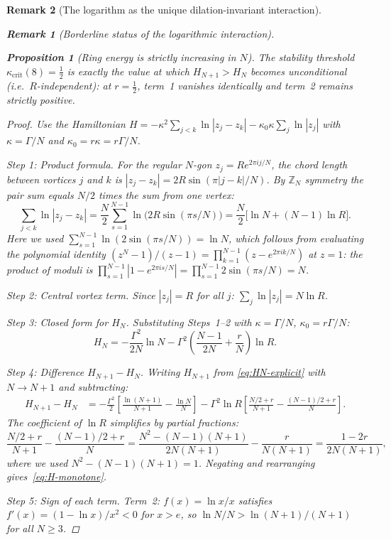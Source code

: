 \documentclass[12pt, a4paper]{article}
\newtheorem{proposition}[theorem]{Proposition}
\newtheorem{remark}{Remark}[section]
\numberwithin{equation}{section}
\begin{document}
\begin{remark}[The logarithm as the unique dilation-invariant interaction]
\begin{remark}[Borderline status of the logarithmic interaction]
\begin{proposition}[Ring energy is strictly increasing in $N$]
The stability threshold $\kappa_{\mathrm{crit}}(8) = \tfrac{1}{2}$ is
exactly the value at which $H_{N+1} > H_N$ becomes unconditional (i.e.\
$R$-independent): at $r = \tfrac{1}{2}$, term~1 vanishes identically
and term~2 remains strictly positive.
\end{proposition}
\begin{proof}
Use the Hamiltonian
$H = -\kappa^2\!\sum_{j<k}\ln|z_j - z_k| - \kappa_0\kappa\!\sum_j\ln|z_j|$
with $\kappa = \Gamma/N$ and $\kappa_0 = r\kappa = r\Gamma/N$.

\emph{Step 1: Product formula.}
For the regular $N$-gon $z_j = Re^{2\pi ij/N}$, the chord length
between vortices $j$ and $k$ is $|z_j - z_k| = 2R\sin(\pi|j-k|/N)$.
By $\mathbb{Z}_N$ symmetry the pair sum equals $N/2$ times the sum from
one vertex:
\[
  \sum_{j<k}\ln|z_j - z_k|
  = \frac{N}{2}\sum_{s=1}^{N-1}\ln\!\bigl(2R\sin(\pi s/N)\bigr)
  = \frac{N}{2}\bigl[\ln N + (N-1)\ln R\bigr].
\]
Here we used $\sum_{s=1}^{N-1}\ln(2\sin(\pi s/N)) = \ln N$, which
follows from evaluating the polynomial identity $(z^N-1)/(z-1) =
\prod_{k=1}^{N-1}(z - e^{2\pi ik/N})$ at $z = 1$: the product of
moduli is $\prod_{s=1}^{N-1}|1 - e^{2\pi is/N}|
= \prod_{s=1}^{N-1}2\sin(\pi s/N) = N$.

\emph{Step 2: Central vortex term.}
Since $|z_j| = R$ for all $j$: $\sum_j\ln|z_j| = N\ln R$.

\emph{Step 3: Closed form for $H_N$.}
Substituting Steps~1--2 with $\kappa = \Gamma/N$, $\kappa_0 = r\Gamma/N$:
\begin{equation}\label{eq:HN-explicit}
  H_N = -\frac{\Gamma^2}{2N}\ln N
        - \Gamma^2\!\left(\frac{N-1}{2N} + \frac{r}{N}\right)\ln R.
\end{equation}

\emph{Step 4: Difference $H_{N+1} - H_N$.}
Writing $H_{N+1}$ from \eqref{eq:HN-explicit} with $N\to N+1$ and
subtracting:
\begin{align*}
  H_{N+1} - H_N
  &= -\frac{\Gamma^2}{2}\!\left[\frac{\ln(N{+}1)}{N{+}1}
     - \frac{\ln N}{N}\right]
     - \Gamma^2\ln R\!\left[\frac{N/2+r}{N{+}1}
     - \frac{(N{-}1)/2+r}{N}\right].
\end{align*}
The coefficient of $\ln R$ simplifies by partial fractions:
\[
  \frac{N/2+r}{N{+}1} - \frac{(N{-}1)/2+r}{N}
  = \frac{N^2 - (N{-}1)(N{+}1)}{2N(N{+}1)} - \frac{r}{N(N{+}1)}
  = \frac{1-2r}{2N(N{+}1)},
\]
where we used $N^2-(N-1)(N+1) = 1$.  Negating and rearranging
gives~\eqref{eq:H-monotone}.

\emph{Step 5: Sign of each term.}
\emph{Term~2}: $f(x) = \ln x/x$ satisfies $f'(x) = (1-\ln x)/x^2 < 0$
for $x > e$, so $\ln N/N > \ln(N+1)/(N+1)$ for all $N \ge 3$.


\end{proof}
\end{remark}
\end{remark}
\end{document}
